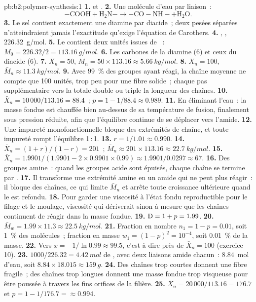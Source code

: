 \begin{solution}{pb:b2:polymer-synthesis:1}
\textbf{1.}  et .
\textbf{2.} Une molécule d'eau par liaison~:
\[\mathrm{{-}COOH + H_2N{-} \longrightarrow {-}CO{-}NH{-} + H_2O}.\]
\textbf{3.} Le sel contient exactement une diamine par diacide~; deux pesées séparées
n'atteindraient jamais l'exactitude qu'exige l'équation de Carothers.
\textbf{4.} \ce{-[NH(CH2)6NH-CO(CH2)4CO]-}, , \qty{226.32}{g/mol}.
\textbf{5.} Le  contient deux unités issues de ~: $M_0 = 226.32/2 = \qty{113.16}{g/mol}$.
\textbf{6.} Les carbones de la diamine (6) et ceux du diacide (6).
\textbf{7.} $\bar X_n = 50$, $\bar M_n = 50 \times 113.16 \approx \qty{5.66}{kg/mol}$.
\textbf{8.} $\bar X_n = 100$, $\bar M_n \approx \qty{11.3}{kg/mol}$.
\textbf{9.} Avec 99~\% des groupes ayant réagi, la chaîne moyenne ne compte que 100 unités, trop peu pour
une fibre solide~; chaque pas supplémentaire vers la  totale double ou triple la longueur des chaînes.
\textbf{10.} $\bar X_n = 10\,000/113.16 = 88.4$~; $p = 1 - 1/88.4 \approx 0.989$.
\textbf{11.} En éliminant l'eau~: la masse fondue est chauffée bien au-dessus de sa température de fusion,
finalement sous pression réduite, afin que l'équilibre continue de se déplacer vers l'amide.
\textbf{12.} Une impureté monofonctionnelle bloque des extrémités de chaîne, et toute impureté rompt
l'équilibre 1\,:\,1.
\textbf{13.} $r = 1/1.01 \approx 0.990$.
\textbf{14.} $\bar X_n = (1+r)/(1-r) = 201$~; $\bar M_n \approx 201 \times 113.16 \approx
\qty{22.7}{kg/mol}$.
\textbf{15.} $\bar X_n = 1.9901/(1.9901 - 2 \times 0.9901 \times 0.99) \approx 1.9901/0.0297 \approx
67$.
\textbf{16.} Des groupes amine~: quand les groupes acide sont épuisés, chaque chaîne se termine par .
\textbf{17.} Il transforme une extrémité amine en un amide qui ne peut plus réagir~: il bloque des chaînes,
ce qui limite $\bar M_n$ et arrête toute croissance ultérieure quand le  est refondu.
\textbf{18.} Pour garder une viscosité à l'état fondu reproductible pour le filage et le moulage, viscosité
qui dériverait sinon à mesure que les chaînes continuent de réagir dans la masse fondue.
\textbf{19.} $\text{\DH} = 1 + p = 1.99$.
\textbf{20.} $\bar M_w = 1.99 \times 11.3 \approx \qty{22.5}{kg/mol}$.
\textbf{21.} Fraction en nombre $n_1 = 1 - p = 0.01$, soit 1~\% des molécules~; fraction en masse $w_1 = (1-p)^2 =
10^{-4}$, soit 0.01~\% de la masse.
\textbf{22.} Vers $x = -1/\ln 0.99 \approx 99.5$, c'est-à-dire près de $\bar X_n = 100$ (exercice 10).
\textbf{23.} $1000/226.32 = \qty{4.42}{mol}$ de , avec deux liaisons amide chacun~:
\qty{8.84}{mol} d'eau, soit $8.84 \times 18.015 \approx \qty{159}{g}$.
\textbf{24.} Des chaînes trop courtes donnent une fibre fragile~; des chaînes trop longues donnent une masse
fondue trop visqueuse pour être poussée à travers les fins orifices de la filière.
\textbf{25.} $\bar X_n = 20\,000/113.16 = 176.7$ et $p = 1 - 1/176.7 = \boldsymbol{\approx 0.994}$.
\end{solution}
